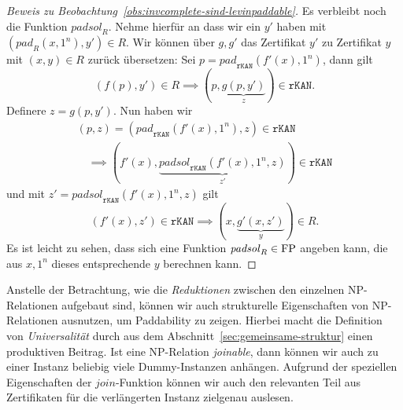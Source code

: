 \begin{proof}[Beweis zu Beobachtung~\ref{obs:invcomplete-sind-levinpaddable}]
    Es verbleibt noch die Funktion $\mathit{padsol}_R$. Nehme hierfür an dass wir ein $y'$ haben mit $(\mathit{pad}_R(x, 1^n), y')\in R$.
    Wir können über $g, g'$ das Zertifikat $y'$ zu Zertifikat $y$ mit $(x, y)\in R$ zurück übersetzen:
    Sei $p=\mathit{pad}_\mathtt{rKAN}(f'(x), 1^n)$, dann gilt
    \[ (f(p), y')\in R \implies (p, \underbrace{g(p, y')}_z)\in \mathtt{rKAN}. \]
    Definere $z=g(p, y')$.
    Nun haben wir
    \begin{gather*} (p, z)=(\mathit{pad}_\mathtt{rKAN}(f'(x), 1^n), z)\in\mathtt{rKAN}  \\\quad\implies (f'(x), \underbrace{\mathit{padsol}_\mathtt{rKAN}(f'(x), 1^n, z)}_{z'})\in\mathtt{rKAN} \end{gather*}
    und mit $z'=\mathit{padsol}_\mathtt{rKAN}(f'(x), 1^n, z)$ gilt
    \[ (f'(x), z') \in \mathtt{rKAN} \implies (x, \underbrace{g'(x, z')}_{y}) \in R. \]
    Es ist leicht zu sehen, dass sich eine Funktion $\mathit{padsol}_R\in\mathrm{FP}$ angeben kann, die aus $x, 1^n$ dieses entsprechende $y$ berechnen kann.
\end{proof}

Anstelle der Betrachtung, wie die \emph{Reduktionen} zwischen den einzelnen NP-Relationen aufgebaut sind, können wir auch strukturelle Eigenschaften von NP-Relationen ausnutzen, um Paddability zu zeigen. Hierbei macht die Definition von \emph{Universalität} durch \textcite{agrawal_universal_1992} aus dem Abschnitt~\ref{sec:gemeinsame-struktur} einen produktiven Beitrag. Ist eine NP-Relation \emph{joinable}, dann können wir auch zu einer Instanz beliebig viele Dummy-Instanzen anhängen. Aufgrund der speziellen Eigenschaften der $\mathit{join}$-Funktion können wir auch den relevanten Teil aus Zertifikaten für die verlängerten Instanz zielgenau auslesen.

